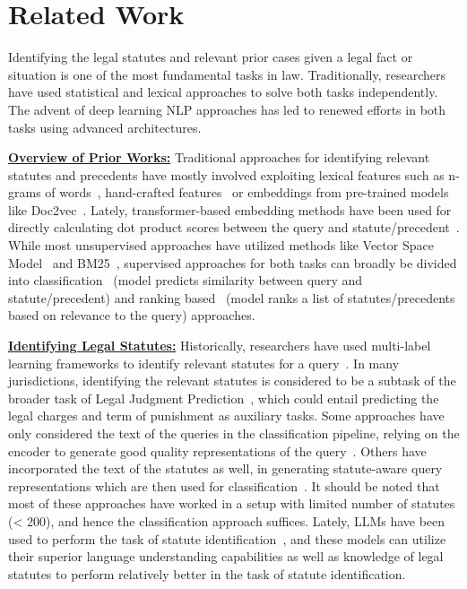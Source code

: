 \section{Related Work} \label{app:related-work}

Identifying the legal statutes and relevant prior cases given a legal fact or situation is one of the most fundamental tasks in law.
Traditionally, researchers have used statistical and lexical approaches to solve both tasks independently. The advent of deep learning NLP approaches has led to renewed efforts in both tasks using advanced architectures.

\vspace{1mm}
\noindent\underline{\bf Overview of Prior Works:} \label{sec:relwork/overview}
Traditional approaches for identifying relevant statutes and precedents have mostly involved exploiting lexical features such as n-grams of words~\citep{salton1988termweight}, hand-crafted features~\citep{zeng2007knowledge} or embeddings from pre-trained models like Doc2vec~\citep{le2014doc2vec}.
Lately, transformer-based embedding methods have been used for directly calculating dot product scores between the query and statute/precedent~\citep{vold2021tflegal}.
While most unsupervised approaches have utilized methods like Vector Space Model~\citep{salton1975vector} and BM25~\citep{robertson2009bm25}, supervised approaches for both tasks can broadly be divided into classification~\citep{liu2023ml,hofmann2013balancing} (model predicts similarity between query and statute/precedent) and ranking based~\citep{wang2018modeling,ma2022incorporating} (model ranks a list of statutes/precedents based on relevance to the query) approaches. 

\vspace{1mm}
\noindent\underline{\bf Identifying Legal Statutes:} \label{sec:relwork/statutes}
Historically, researchers have used multi-label learning frameworks to identify relevant statutes for a query~\citep{wang2018modeling,wang2019hmn,chalkidis2019neural}. In many jurisdictions, identifying the relevant statutes is considered to be a subtask of the broader task of Legal Judgment Prediction~\citep{zhong2018topjudge}, which could entail predicting the legal charges and term of punishment as auxiliary tasks.
Some approaches have only considered the text of the queries in the classification pipeline, relying on the encoder to generate good quality representations of the query~\citep{chalkidis2019neural}.
Others have incorporated the text of the statutes as well, in generating statute-aware query representations which are then used for classification~\citep{wang2018modeling,wang2019hmn}.
It should be noted that most of these approaches have worked in a setup with limited number of statutes (< 200), and hence the classification approach suffices.
Lately, LLMs have been used to perform the task of statute identification~\citep{wu2023precedent}, and these models can utilize their superior language understanding capabilities as well as knowledge of legal statutes to perform relatively better in the task of statute identification.

